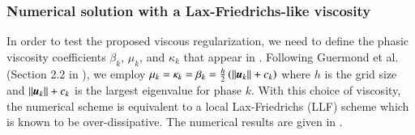 \subsubsection{Numerical solution with a Lax-Friedrichs-like viscosity}\label{sec:lf-scheme}
In order to test the proposed viscous regularization, we need to define the phasic viscosity coefficients $\beta_k$, $\mu_k$, and $\kappa_k$ that appear in . 
Following Guermond et al. (Section 2.2 in \cite{jlg_VR_SIAM_2004}), we employ $\mu_k =  \kappa_k = \beta_k = \tfrac{h}{2} \left( ||\boldsymbol u_k|| + c_k \right)$ where $h$ is the grid size and $||\boldsymbol u_k|| + c_k$ is the 
largest eigenvalue for phase $k$. With this choice of viscosity, the numerical scheme is equivalent to a local Lax-Friedrichs (LLF) scheme which is known to be over-dissipative. The numerical results are
given in .
%
